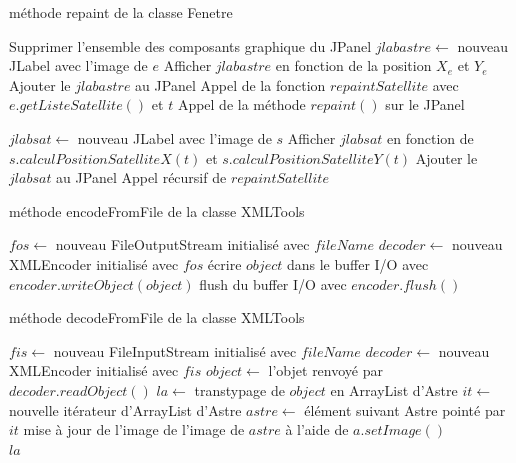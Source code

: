 \documentclass[a4paper,10pt]{article}
\begin{document}
\begin{algorithm}
\caption{méthode repaint de la classe Fenetre}
\begin{algorithmic}
\State Supprimer l'ensemble des composants graphique du JPanel
    \State $jlabastre\gets$ nouveau JLabel avec l'image de $e$
    \State Afficher $jlabastre$ en fonction de la position $X_{e}$ et $Y_{e}$
    \State Ajouter le $jlabastre$ au JPanel
    \State Appel de la fonction $repaintSatellite$ avec $e.getListeSatellite()$ et $t$
\EndFor
\State Appel de la méthode $repaint()$ sur le JPanel
\EndFunction
\end{algorithmic}

\begin{algorithmic}
  \State $jlabsat\gets$ nouveau JLabel avec l'image de $s$
  \State Afficher $jlabsat$ en fonction de $s.calculPositionSatelliteX(t)$ et $s.calculPositionSatelliteY(t)$
  \State Ajouter le $jlabsat$ au JPanel
  \State Appel récursif de $repaintSatellite$
\EndFor
\EndFunction
\end{algorithmic}
\end{algorithm}

\begin{algorithm}
\caption{méthode encodeFromFile de la classe XMLTools}
 \begin{algorithmic}
\State $fos\gets$ nouveau FileOutputStream initialisé avec $fileName$
\State $decoder\gets$ nouveau XMLEncoder initialisé avec $fos$
\State écrire $object$ dans le buffer I/O avec $encoder.writeObject(object)$
\State flush du buffer I/O avec $encoder.flush()$
\EndFunction
 \end{algorithmic}
\end{algorithm}

\begin{algorithm}
\caption{méthode decodeFromFile de la classe XMLTools}
 \begin{algorithmic}
\State $fis\gets$ nouveau FileInputStream initialisé avec $fileName$
\State $decoder\gets$ nouveau XMLEncoder initialisé avec $fis$
\State $object\gets$ l'objet renvoyé par $decoder.readObject()$
\State $la\gets$ transtypage de $object$ en ArrayList d'Astre
\State $it\gets$ nouvelle itérateur d'ArrayList d'Astre
  \State $astre\gets$ élément suivant Astre pointé par $it$
  \State mise à jour de l'image de l'image de $astre$ à l'aide de $a.setImage()$
\EndWhile \\
\Return $la$
\EndFunction
 \end{algorithmic}
\end{algorithm}
\end{document}
